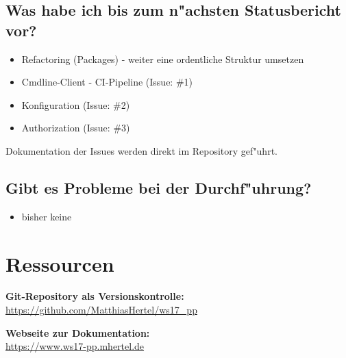 \documentclass[12pt]{article}
\begin{document}
\subsection{Was habe ich bis zum n"achsten Statusbericht vor?}

\begin{itemize}

\item Refactoring (Packages) - weiter eine ordentliche Struktur umsetzen
\item Cmdline-Client - CI-Pipeline (Issue: \#1)
\item Konfiguration (Issue: \#2)
\item Authorization (Issue: \#3)
\end{itemize}

Dokumentation der Issues werden direkt im Repository gef"uhrt.

\subsection{Gibt es Probleme bei der Durchf"uhrung?}
\begin{itemize}
\item bisher keine
\end{itemize}


\section{Ressourcen}
\textbf{Git-Repository als Versionskontrolle:}\\
\url{https://github.com/MatthiasHertel/ws17_pp}

\textbf{Webseite zur Dokumentation:}\\
\url{https://www.ws17-pp.mhertel.de}
\end{document}
